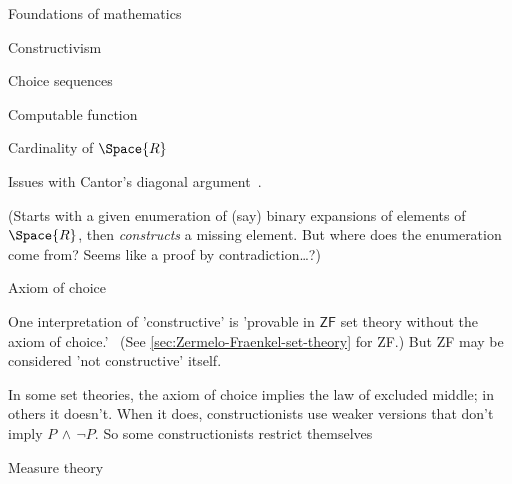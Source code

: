 \begin{plSection}{Foundations of mathematics}
\begin{plSection}{Constructivism}
\begin{plSection}{Choice sequences}
\end{plSection}%
\begin{plSection}{Computable function}
\label{sec:Computable_function}
\cite{wiki:ComputableFunction}

\end{plSection}%
\begin{plSection}{Cardinality of \texorpdfstring{$\Space{R}$}{R}}
\label{sec:Cardinality_of_R}

Issues with Cantor's diagonal 
argument~\cite{wiki:CantorsDiagonalArgument}.

(Starts with a given enumeration of (say) binary expansions of 
elements of $\Space{R}$, then \textit{constructs} a missing
element. But where does the enumeration come from?
Seems like a proof by contradiction\ldots?)

\end{plSection}%
\begin{plSection}{Axiom of choice}
\label{sec:AxiomOfchoice}

One interpretation of 'constructive' is
'provable in $\textsf{ZF}$ set theory without the axiom of 
choice.'~\cite{iep:SetTheory,wiki:AxiomOfChoice}
(See \cref{sec:Zermelo-Fraenkel-set-theory} for \textsf{ZF}.)
But \textsf{ZF} may be considered 'not constructive'
itself.

In some set theories, the axiom of choice implies
the law of excluded middle; in others it doesn't.
When it does, constructionists use weaker versions
that don't imply $P \, \wedge \, \lnot P$.
So some constructionists restrict themselves

\end{plSection}%
\begin{plSection}{Measure theory}
\label{sec:Measure_theory}


\end{plSection}%
\end{plSection}%
\end{plSection}%
 